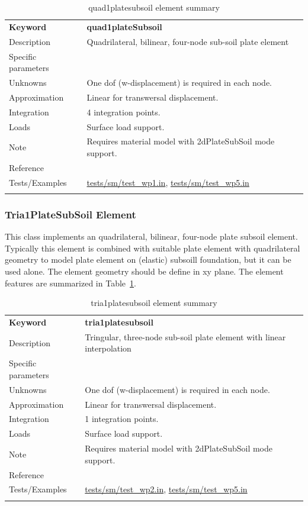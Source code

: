 \documentclass[a4paper]{article}
\newcommand{\param}[1]{\texttt{#1}} %
\newcommand{\templabel}{}%
\newcommand{\tempcaption}{}%
\newcounter{nelpar}
\newenvironment{elementsummary}[5]{%
  \gdef\tempcaption{#4}%
  \gdef\templabel{#5}%
  \setcounter{nelpar}{0}%
  \begin{center} %
    \begin{table}[!htb] %
      \begin{tabular}{|l|p{9cm}|}\hline %
        {\bf Keyword} & \bf{#1}\\ %
        {Description} & {#2}\\ %
        {Specific parameters} & {#3}\\ \hline %
}{
  \\ \hline %
      \end{tabular}%
      \caption{\tempcaption}%
      \label{\templabel}%
    \end{table}%
  \end{center}%
}
\newcommand{\elementParam}[1]{%
  \ifthenelse{\value{nelpar}>0} %
             {&{#1}}%
             {\setcounter{nelpar}{1}Parameters&{#1}}%
             \\%
}
\newcommand{\elementDescription}[2]{{#1} & {#2}\\}
\begin{document}
\begin{elementsummary}{quad1plateSubsoil}{Quadrilateral, bilinear, four-node sub-soil plate element}{}{quad1platesubsoil element summary}{quad1platesubsoilsummary}
\elementDescription{Unknowns}{One dof (w-displacement) is required in each node.}
\elementDescription{Approximation}{Linear for transwersal displacement.}
\elementDescription{Integration}{4 integration points.}
\elementDescription{Loads}{Surface load support.}
\elementDescription{Note}{Requires material model with 2dPlateSubSoil mode support.}
\elementDescription{Reference}{\cite{BittnarSejnoha1996}}
\elementDescription{Tests/Examples}{\href{https://github.com/oofem/oofem/blob/devel/tests/sm/test\_wp1.in}{tests/sm/test\_wp1.in},
  \href{https://github.com/oofem/oofem/blob/devel/tests/sm/test\_wp5.in}{tests/sm/test\_wp5.in}}

\end{elementsummary}

\subsubsection{Tria1PlateSubSoil Element} \label{tria1platesubsoil}
This class implements an quadrilateral, bilinear, four-node plate subsoil element.
Typically this element is combined with suitable plate element with quadrilateral geometry to model plate element on 
(elastic) subsoill foundation, but it can be used alone. The element geometry should be define in xy plane.
The element features are summarized in Table~\ref{quad1platesubsoilsummary}.

\begin{elementsummary}{tria1platesubsoil}{Tringular, three-node sub-soil plate element with linear interpolation}{}{tria1platesubsoil element summary}{tria1platesubsoilsummary}
\elementDescription{Unknowns}{One dof (w-displacement) is required in each node.}
\elementDescription{Approximation}{Linear for transwersal displacement.}
\elementDescription{Integration}{1 integration points.}
\elementDescription{Loads}{Surface load support.}
\elementDescription{Note}{Requires material model with 2dPlateSubSoil mode support.}
\elementDescription{Reference}{\cite{BittnarSejnoha1996}}
\elementDescription{Tests/Examples}{\href{https://github.com/oofem/oofem/blob/devel/tests/sm/test\_wp2.in}{tests/sm/test\_wp2.in},
  \href{https://github.com/oofem/oofem/blob/devel/tests/sm/test\_wp5.in}{tests/sm/test\_wp5.in}}
\end{elementsummary}
\end{document}
